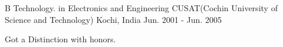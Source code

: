 

\begin{cventries}

  \cventry
    {B Technology. in Electronics and Engineering} %
    {CUSAT(Cochin University of Science and Technology)} %
    {Kochi, India} %
    {Jun. 2001 - Jun. 2005} %
    {
      \begin{cvitems} %
        \item {Got a Distinction with honors.}
      \end{cvitems}
    }

\end{cventries}
